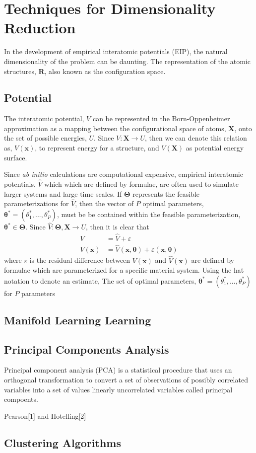 \chapter{Techniques for Dimensionality Reduction}

In the development of empirical interatomic potentials (EIP), the natural dimensionality of the problem can be daunting.
The representation of the atomic structures, $\bm{R}$, also known as the configuration space.

\section{Potential}

The interatomic potential, $V$ can be represented in the Born-Oppenheimer approximation as a mapping between the configurational space of atoms, $\bm{X}$, onto the set of possible energies, $U$.
Since $V:\bm{X} \rightarrow U$, then we can denote this relation as, $V(\bm{x})$, to represent energy for a structure, and $V(\bm{X})$ as potential energy surface.

Since \emph{ab initio} calculations are computational expensive, empirical interatomic potentials, $\hat{V}$ which which are defined by formulae, are often used to simulate larger systems and large time scales.
If $\bm{\Theta}$ represents the feasible parameterizations for $\hat{V}$, then the vector of $P$ optimal parameters, $\bm{\theta}^{*} = (\theta_1^{*},...,\theta_P^{*})$, must be be contained within the feasible parameterization, $\bm{\theta}^{*} \in \bm{\Theta}$.
Since $\hat{V}:\bm{\Theta},\bm{X} \rightarrow U$, then it is clear that
\begin{align}
  V &= \hat{V} + \varepsilon \\
  V(\bm{x}) &= \hat{V}(\bm{x},\bm{\theta}) + \varepsilon(\bm{x},\bm{\theta})
\end{align}
where $\varepsilon$ is the residual difference between $V(\bm{x})$ and $\hat{V}(\bm{x})$
 are defined by formulae which are parameterized for a specific material system.  Using the hat notation to denote an estimate,   The set of optimal parameters, $\bm{\theta}^{*} = (\theta_1^{*},...,\theta_P^{*})$ for $P$ parameters

\section{Manifold Learning Learning}

\section{Principal Components Analysis}

Principal component analysis (PCA) is a statistical procedure that uses an orthogonal transformation to convert a set of observations of possibly correlated variables into a set of values linearly uncorrelated variables called principal compoents.

Pearson[1] and Hotelling[2]

\section{Clustering Algorithms}
